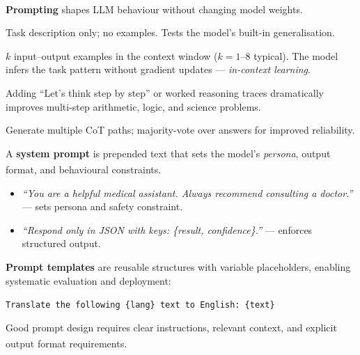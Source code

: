 \begin{tcbitemize}[ skin=sectionraster ]

    \tcbitem[title={Prompting Strategies}, raster multicolumn=3]
    \textbf{Prompting} shapes LLM behaviour without changing model
    weights.\textsuperscript{\cite[][p.~82]{farrisHowLargeLanguage2025}}

    \begin{description}[leftmargin=0.4cm, labelindent=0pt]
        \item[\textbf{Zero-shot}] Task description only; no examples.
              Tests the model's built-in generalisation.
        \item[\textbf{Few-shot}] $k$ input--output examples in the context window
              ($k=1$--$8$ typical). The model infers the task pattern without gradient
              updates --- \emph{in-context learning}.
        \item[\textbf{Chain-of-Thought (CoT)}] Adding ``Let's think step by step'' or
              worked reasoning traces dramatically improves multi-step arithmetic, logic,
              and science problems.
        \item[\textbf{Self-consistency}] Generate multiple CoT paths; majority-vote over
              answers for improved reliability.
    \end{description}

    \tcbitem[title={System Prompts and Prompt Templates}, raster multicolumn=3]
    A \textbf{system prompt} is prepended text that sets the model's \emph{persona},
    output format, and behavioural
    constraints.\textsuperscript{\cite[][p.~68]{farrisHowLargeLanguage2025}}

    \begin{itemize}
        \item \emph{``You are a helpful medical assistant. Always recommend consulting a
              doctor.''} --- sets persona and safety constraint.
        \item \emph{``Respond only in JSON with keys: \{result, confidence\}.''} ---
              enforces structured output.
    \end{itemize}

    \textbf{Prompt templates} are reusable structures with variable placeholders,
    enabling systematic evaluation and deployment:
    \begin{center}
        \texttt{Translate the following \{lang\} text to English: \{text\}}
    \end{center}

    Good prompt design requires clear instructions, relevant context, and explicit output
    format
    requirements.\textsuperscript{\cite[][p.~70]{farrisHowLargeLanguage2025}}

\end{tcbitemize}

